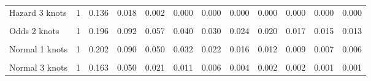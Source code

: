\documentclass[
]{article}
\begin{document}
\begin{table}[H]
{\begin{tabular}[t]{lrrrrrrrrrrr}
Hazard 3 knots & 1 & 0.136 & 0.018 & 0.002 & 0.000 & 0.000 & 0.000 & 0.000 & 0.000 & 0.000 & 0.000\\
\cellcolor{gray!10}{Odds 1 knots} & \cellcolor{gray!10}{1} & \cellcolor{gray!10}{0.223} & \cellcolor{gray!10}{0.121} & \cellcolor{gray!10}{0.083} & \cellcolor{gray!10}{0.062} & \cellcolor{gray!10}{0.050} & \cellcolor{gray!10}{0.042} & \cellcolor{gray!10}{0.036} & \cellcolor{gray!10}{0.031} & \cellcolor{gray!10}{0.028} & \cellcolor{gray!10}{0.025}\\
Odds 2 knots & 1 & 0.196 & 0.092 & 0.057 & 0.040 & 0.030 & 0.024 & 0.020 & 0.017 & 0.015 & 0.013\\
\cellcolor{gray!10}{Odds 3 knots} & \cellcolor{gray!10}{1} & \cellcolor{gray!10}{0.172} & \cellcolor{gray!10}{0.067} & \cellcolor{gray!10}{0.038} & \cellcolor{gray!10}{0.025} & \cellcolor{gray!10}{0.018} & \cellcolor{gray!10}{0.013} & \cellcolor{gray!10}{0.011} & \cellcolor{gray!10}{0.009} & \cellcolor{gray!10}{0.007} & \cellcolor{gray!10}{0.006}\\
Normal 1 knots & 1 & 0.202 & 0.090 & 0.050 & 0.032 & 0.022 & 0.016 & 0.012 & 0.009 & 0.007 & 0.006\\
\cellcolor{gray!10}{Normal 2 knots} & \cellcolor{gray!10}{1} & \cellcolor{gray!10}{0.193} & \cellcolor{gray!10}{0.081} & \cellcolor{gray!10}{0.043} & \cellcolor{gray!10}{0.026} & \cellcolor{gray!10}{0.017} & \cellcolor{gray!10}{0.012} & \cellcolor{gray!10}{0.009} & \cellcolor{gray!10}{0.007} & \cellcolor{gray!10}{0.005} & \cellcolor{gray!10}{0.004}\\
Normal 3 knots & 1 & 0.163 & 0.050 & 0.021 & 0.011 & 0.006 & 0.004 & 0.002 & 0.002 & 0.001 & 0.001\\
\bottomrule
\end{tabular}}
\end{table}
\end{document}

